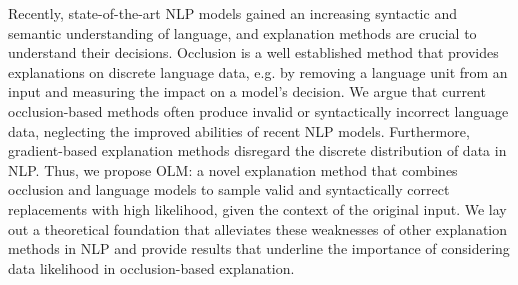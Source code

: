 Recently, state-of-the-art NLP models gained an increasing syntactic and semantic understanding of language, and explanation methods are crucial to understand their decisions. Occlusion is a well established method that provides explanations on discrete language data, e.g. by removing a language unit from an input and measuring the impact on a model's decision. We argue that current occlusion-based methods often produce invalid or syntactically incorrect language data, neglecting the improved abilities of recent NLP models. Furthermore, gradient-based explanation methods disregard the discrete distribution of data in NLP. Thus, we propose OLM: a novel explanation method that combines occlusion and language models to sample valid and syntactically correct replacements with high likelihood, given the context of the original input. We lay out a theoretical foundation that alleviates these weaknesses of other explanation methods in NLP and provide results that underline the importance of considering data likelihood in occlusion-based explanation.
